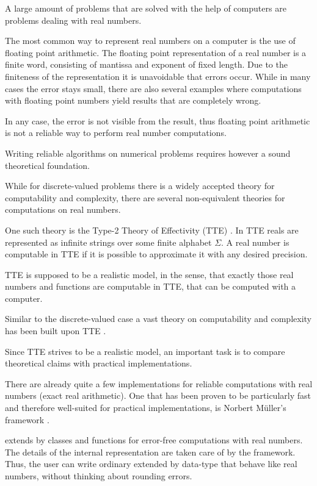 A large amount of problems that are solved with the help of computers are
problems dealing with real numbers.

The most common way to represent real numbers on a computer is the use of floating point
arithmetic.
The floating point representation of a real number is a finite word, consisting
of mantissa and exponent of fixed length.
Due to the finiteness of the representation it is unavoidable that errors
occur.
While in many cases the error stays small, there are also several examples
where computations with floating point numbers yield results that are
completely wrong.

In any case, the error is not visible from the result, thus floating point
arithmetic is not a reliable way to perform real number computations.

Writing reliable algorithms on numerical problems requires however a sound
theoretical foundation.

While for discrete-valued problems there is a widely accepted theory for
computability and complexity, there are several non-equivalent theories for
computations on real numbers.

One such theory is the Type-2 Theory of Effectivity (TTE) \cite{Wei}.
In TTE reals are represented as infinite strings over some finite alphabet
$\Sigma$.
A real number is computable in TTE if it is possible to approximate it with any
desired precision.

TTE is supposed to be a realistic model, in the sense, that exactly those
real numbers and functions are computable in TTE, that can be computed with a
computer.

Similar to the discrete-valued case a vast theory on computability and
complexity has been built upon TTE \cite{viel}.

Since TTE strives to be a realistic model, an important task is to compare
theoretical claims with practical implementations.

There are already quite a few implementations for reliable computations with
real numbers (exact real arithmetic).
One that has been proven to be particularly fast and therefore well-suited for
practical implementations, is Norbert M\"uller's \cc framework \irram
\cite{irram}.

\irram extends \cc by classes and functions for error-free computations with
real numbers.
The details of the internal representation are taken care of by the framework. 
Thus, the user can write ordinary \cc extended by data-type that behave like
real numbers, without thinking about rounding errors.

